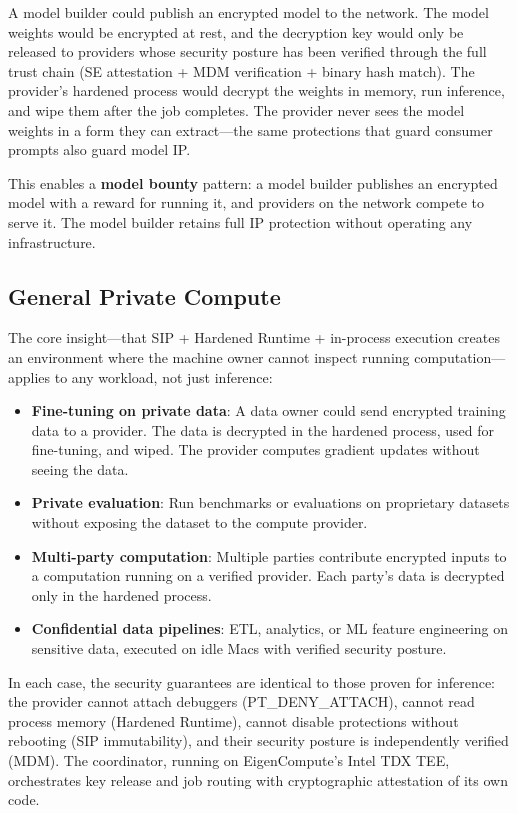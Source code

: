 \documentclass[10pt,twocolumn,letterpaper]{article}
\begin{document}
A model builder could publish an encrypted model to the network. The model weights would be encrypted at rest, and the decryption key would only be released to providers whose security posture has been verified through the full trust chain (SE attestation + MDM verification + binary hash match). The provider's hardened process would decrypt the weights in memory, run inference, and wipe them after the job completes. The provider never sees the model weights in a form they can extract---the same protections that guard consumer prompts also guard model IP.

This enables a \textbf{model bounty} pattern: a model builder publishes an encrypted model with a reward for running it, and providers on the network compete to serve it. The model builder retains full IP protection without operating any infrastructure.

\subsection{General Private Compute}

The core insight---that SIP + Hardened Runtime + in-process execution creates an environment where the machine owner cannot inspect running computation---applies to any workload, not just inference:

\begin{itemize}[leftmargin=*,itemsep=2pt]
    \item \textbf{Fine-tuning on private data}: A data owner could send encrypted training data to a provider. The data is decrypted in the hardened process, used for fine-tuning, and wiped. The provider computes gradient updates without seeing the data.
    \item \textbf{Private evaluation}: Run benchmarks or evaluations on proprietary datasets without exposing the dataset to the compute provider.
    \item \textbf{Multi-party computation}: Multiple parties contribute encrypted inputs to a computation running on a verified provider. Each party's data is decrypted only in the hardened process.
    \item \textbf{Confidential data pipelines}: ETL, analytics, or ML feature engineering on sensitive data, executed on idle Macs with verified security posture.
\end{itemize}

In each case, the security guarantees are identical to those proven for inference: the provider cannot attach debuggers (PT\_DENY\_ATTACH), cannot read process memory (Hardened Runtime), cannot disable protections without rebooting (SIP immutability), and their security posture is independently verified (MDM). The coordinator, running on EigenCompute's Intel TDX TEE, orchestrates key release and job routing with cryptographic attestation of its own code.
\end{document}
